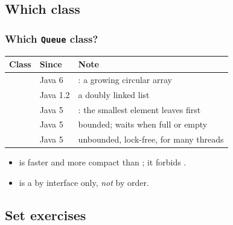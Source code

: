 \documentclass[aspectratio=169,10pt, compress]{beamer}
\begin{document}
\subsection[Classes]{Which class}




\begin{frame}[t,fragile] \frametitle{Which \texttt{Queue} class?}
  \begin{center}\footnotesize
  \begin{tabular}{@{}lL{0.16\textwidth}L{0.42\textwidth}@{}}
    \toprule
    \textbf{Class}               & \textbf{Since} & \textbf{Note} \\
    \midrule
               & Java 6         & : a growing circular array \\
               & Java 1.2       & a doubly linked list \\
            & Java 5         & : the smallest element leaves first \\
       & Java 5         & bounded; waits when full or empty \\
    & Java 5         & unbounded, lock-free, for many threads \\
    \bottomrule
  \end{tabular}
  \end{center}
  \vspace{0.3em}
  \begin{itemize}\small
    \item {} is faster and more compact than ;
          it forbids .
    \item {} is a  by interface only, \emph{not} by order.
  \end{itemize}
\end{frame}


\subsection[Set]{Set exercises}
\end{document}
